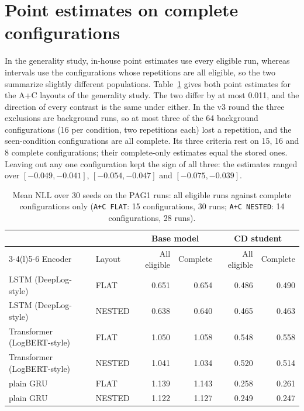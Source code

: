 \section{Point estimates on complete configurations}
\label{sec:repro-complete}

In the generality study, in-house point estimates use every eligible
run, whereas intervals use the configurations whose repetitions are all
eligible, so the two summarize slightly different populations.
Table~\ref{tab:repro-complete} gives both point estimates for the A+C
layouts of the generality study. The two differ by at most 0.011, and
the direction of every contrast is the same under either. In the v3
round the three exclusions are background runs, so at most three of the
64 background configurations (16 per condition, two repetitions each)
lost a repetition, and the seen-condition configurations are all
complete. Its three criteria rest on 15, 16 and 8 complete
configurations; their complete-only estimates equal the stored ones.
Leaving out any one configuration kept the sign of all three: the
estimates ranged over $[-0.049, -0.041]$, $[-0.054, -0.047]$ and
$[-0.075, -0.039]$.

\begin{table}[htbp]
\centering
\caption[Mean NLL on the PAG1 runs, all eligible runs against complete configurations]{Mean NLL over 30 seeds on the PAG1 runs: all eligible runs
against complete configurations only (\texttt{A+C FLAT}: 15
configurations, 30 runs; \texttt{A+C NESTED}: 14 configurations, 28
runs).}
\label{tab:repro-complete}
\small
\begin{tabular}{@{}llrrrr@{}}
\toprule
& & \multicolumn{2}{c}{Base model} & \multicolumn{2}{c}{CD student} \\
\cmidrule(lr){3-4}\cmidrule(l){5-6}
Encoder & Layout & All eligible & Complete & All eligible & Complete \\
\midrule
LSTM (DeepLog-style)        & FLAT   & 0.651 & 0.654 & 0.486 & 0.490 \\
LSTM (DeepLog-style)        & NESTED & 0.638 & 0.640 & 0.465 & 0.463 \\
Transformer (LogBERT-style) & FLAT   & 1.050 & 1.058 & 0.548 & 0.558 \\
Transformer (LogBERT-style) & NESTED & 1.041 & 1.034 & 0.520 & 0.514 \\
plain GRU                   & FLAT   & 1.139 & 1.143 & 0.258 & 0.261 \\
plain GRU                   & NESTED & 1.122 & 1.127 & 0.249 & 0.247 \\
\bottomrule
\end{tabular}
\end{table}

